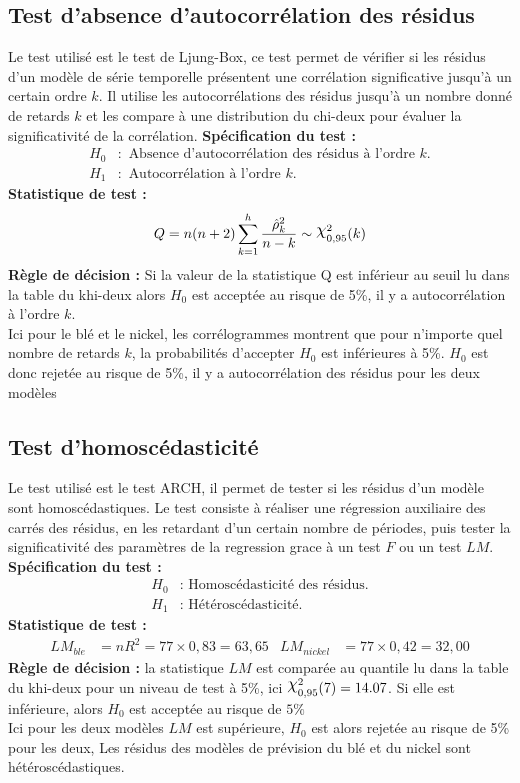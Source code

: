 \subsection*{Test d'absence d'autocorrélation des résidus}
Le test utilisé est le test de Ljung-Box, ce test permet de vérifier si les résidus d'un modèle de série temporelle présentent une corrélation significative jusqu'à un 
certain ordre $k$. Il utilise les autocorrélations des résidus jusqu'à un nombre donné de retards $k$ et les compare à une distribution du chi-deux pour évaluer la 
significativité de la corrélation. \textbf{Spécification du test :} 
    \begin{align*}
        H_{0} &: \text{ Absence d'autocorrélation des résidus à l'ordre $k$.} \\
        H_{1} &: \text{ Autocorrélation à l'ordre $k$.}
    \end{align*}
\textbf{Statistique de test :} 
    \begin{equation*}
        Q = n(n+2)\sum_{k=1}^h\frac{\hat{\rho}^2_k}{n-k} \sim \rchi^{2}_{0,95}(k)
    \end{equation*}
\textbf{Règle de décision :} Si la valeur de la statistique Q est inférieur au seuil lu dans la table du khi-deux alors $H_{0}$ est acceptée au risque de 5\%, il y a autocorrélation à l'ordre $k$.\\
Ici pour le blé et le nickel, les corrélogrammes montrent que pour n'importe quel nombre de retards $k$, la probabilités d'accepter $H_{0}$ est inférieures à 5\%. $H_{0}$ est donc rejetée au risque de 5\%,  il y a autocorrélation des résidus pour les deux modèles\\
\subsection*{Test d'homoscédasticité}
Le test utilisé est le test ARCH, il permet de tester si les résidus d'un modèle sont homoscédastiques. Le test consiste à réaliser une régression auxiliaire des carrés des résidus, en les retardant d'un certain nombre de périodes, puis tester la significativité des paramètres de la regression grace à un test $F$ ou un test $LM$.\\
\textbf{Spécification du test :} 
    \begin{align*}
        H_{0} &: \text{ Homoscédasticité des résidus.} \\
        H_{1} &: \text{ Hétéroscédasticité.}
    \end{align*}
\textbf{Statistique de test :} 
    \begin{align*}
        LM_{ble} &= nR^{2} = 77 \times 0,83 =63,65        & LM_{nickel} &= 77 \times 0,42 =32,00
    \end{align*}
\textbf{Règle de décision :} la statistique $LM$ est comparée au quantile lu dans la table du khi-deux pour un niveau de test à 5\%, ici $\rchi^{2}_{0,95}(7) = 14.07$. Si elle est inférieure, alors $H_{0}$ est acceptée au risque de $5\%$ \\ 
Ici pour les deux modèles $LM$ est supérieure, $H_{0}$ est alors rejetée au risque de 5\% pour les deux, Les résidus des modèles de prévision du blé et du nickel sont hétéroscédastiques.
